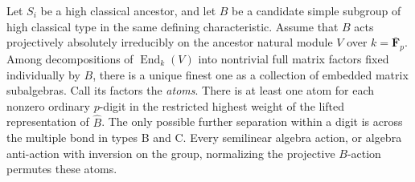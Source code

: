 \begin{lemma}\label{w:atoms}
Let $S_i$ be a high classical ancestor, and let $B$ be a candidate simple subgroup of high classical type in the same defining characteristic. Assume that $B$ acts projectively absolutely irreducibly on the ancestor natural module $V$ over $k=\overline{\mathbf F}_p$. Among decompositions of $\operatorname{End}_k(V)$ into nontrivial full matrix factors fixed individually by $B$, there is a unique finest one as a collection of embedded matrix subalgebras. Call its factors the \emph{atoms}. There is at least one atom for each nonzero ordinary $p$-digit in the restricted highest weight of the lifted representation of $\widehat B$. The only possible further separation within a digit is across the multiple bond in types B and C. Every semilinear algebra action, or algebra anti-action with inversion on the group, normalizing the projective $B$-action permutes these atoms.
\end{lemma}

